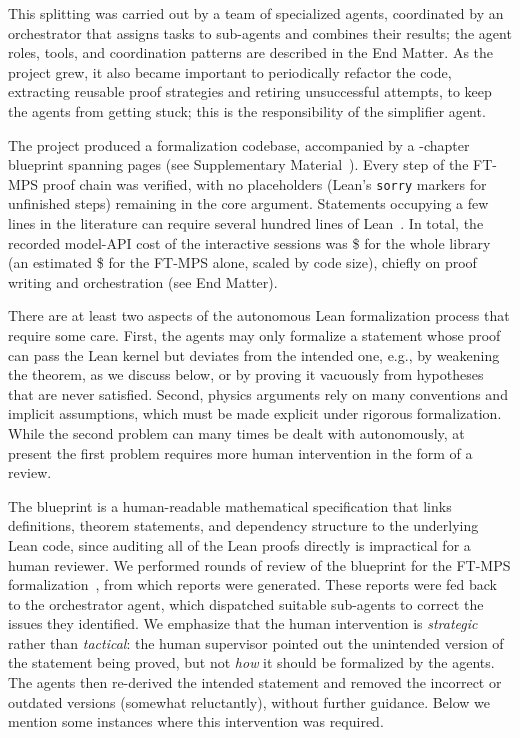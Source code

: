 \documentclass[aps,prl,twocolumn,superscriptaddress,longbibliography,10pt,footinbib]{revtex4-2}
\begin{document}


This splitting was carried out by a team of specialized agents, coordinated by an orchestrator that assigns tasks to sub-agents and combines their results; the agent roles, tools, and coordination patterns are described in the End Matter.
As the project grew, it also became important to periodically refactor the code, extracting reusable proof strategies and retiring unsuccessful attempts, to keep the agents from getting stuck; this is the responsibility of the simplifier agent.


The project produced a formalization codebase, accompanied by a \nChapters{}-chapter blueprint spanning \nPagesBluePrint pages (see Supplementary Material~\cite{Supp}).
Every step of the FT-MPS proof chain was verified, with no placeholders (Lean's \texttt{sorry} markers for unfinished steps) remaining in the core argument.
Statements occupying a few lines in the literature can require several hundred lines of Lean~\cite{Supp}.
In total, the recorded model-API cost of the interactive sessions was \$\nCost{} for the whole library (an estimated \$\nCostFT{} for the FT-MPS alone, scaled by code size), chiefly
on proof writing and orchestration (see End Matter).


%
There are at least two aspects of the autonomous Lean formalization process that require some care. First, the agents may only formalize a statement whose proof can pass the Lean kernel but deviates from the intended one, e.g., by weakening the theorem, as we discuss below, or by proving it vacuously from hypotheses that are never satisfied.
Second, physics arguments rely on many conventions and implicit assumptions, which must be made explicit under rigorous formalization.
While the second problem can many times be dealt with autonomously, at present the first problem requires more human intervention in the form of a review.

The blueprint is a human-readable mathematical specification that links definitions, theorem statements, and dependency structure to the underlying Lean code, since auditing all of the Lean proofs directly is impractical for a human reviewer.
We performed \nReviewRounds{} rounds of review of the blueprint for the FT-MPS formalization~\cite{TNLeanBlueprint}, from which reports were generated. These reports were fed back to the orchestrator agent, which dispatched suitable sub-agents to correct the issues they identified.
We emphasize that the human intervention is \textit{strategic} rather than \textit{tactical}: the human supervisor pointed out the unintended version of the statement being proved, but not \textit{how} it should be formalized by the agents. The agents then re-derived the intended statement and removed the incorrect or outdated versions (somewhat reluctantly), without further guidance. Below we mention some instances where this intervention was required.
\end{document}
